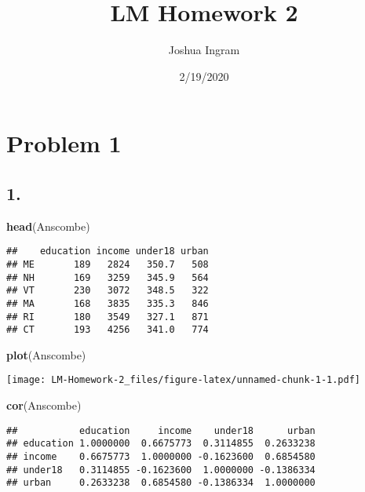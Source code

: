 \documentclass[
]{article}
\title{LM Homework 2}
\author{Joshua Ingram}
\date{2/19/2020}
\newenvironment{Shaded}{\begin{snugshade}}{\end{snugshade}}
\newcommand{\KeywordTok}[1]{\textcolor[rgb]{0.13,0.29,0.53}{\textbf{#1}}}
\newcommand{\NormalTok}[1]{#1}
\begin{document}
\maketitle

\hypertarget{problem-1}{%
\section{Problem 1}\label{problem-1}}

\hypertarget{section}{%
\subsection{1.}\label{section}}

\begin{Shaded}
\begin{Highlighting}[]
\KeywordTok{head}\NormalTok{(Anscombe)}
\end{Highlighting}
\end{Shaded}

\begin{verbatim}
##    education income under18 urban
## ME       189   2824   350.7   508
## NH       169   3259   345.9   564
## VT       230   3072   348.5   322
## MA       168   3835   335.3   846
## RI       180   3549   327.1   871
## CT       193   4256   341.0   774
\end{verbatim}

\begin{Shaded}
\begin{Highlighting}[]
\KeywordTok{plot}\NormalTok{(Anscombe)}
\end{Highlighting}
\end{Shaded}

\texttt{[image: LM-Homework-2\_files/figure-latex/unnamed-chunk-1-1.pdf]}

\begin{Shaded}
\begin{Highlighting}[]
\KeywordTok{cor}\NormalTok{(Anscombe)}
\end{Highlighting}
\end{Shaded}

\begin{verbatim}
##           education     income    under18      urban
## education 1.0000000  0.6675773  0.3114855  0.2633238
## income    0.6675773  1.0000000 -0.1623600  0.6854580
## under18   0.3114855 -0.1623600  1.0000000 -0.1386334
## urban     0.2633238  0.6854580 -0.1386334  1.0000000
\end{verbatim}
\end{document}
